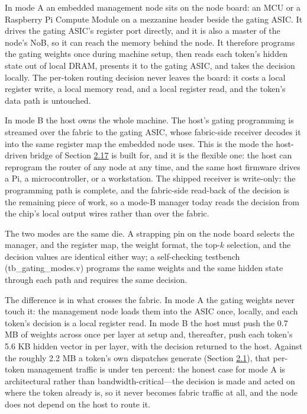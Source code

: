 \documentclass[10pt,twocolumn]{article}
\begin{document}
In mode A an embedded management node sits on the node board: an MCU or a Raspberry Pi Compute Module on a mezzanine header beside the gating ASIC. It drives the gating ASIC's register port directly, and it is also a master of the node's NoB, so it can reach the memory behind the node. It therefore programs the gating weights once during machine setup, then reads each token's hidden state out of local DRAM, presents it to the gating ASIC, and takes the decision locally. The per-token routing decision never leaves the board: it costs a local register write, a local memory read, and a local register read, and the token's data path is untouched.

In mode B the host owns the whole machine. The host's gating programming is streamed over the fabric to the gating ASIC, whose fabric-side receiver decodes it into the same register map the embedded node uses. This is the mode the host-driven bridge of Section \hyperref[sec:2.17]{2.17} is built for, and it is the flexible one: the host can reprogram the router of any node at any time, and the same host firmware drives a Pi, a microcontroller, or a workstation. The shipped receiver is write-only: the programming path is complete, and the fabric-side read-back of the decision is the remaining piece of work, so a mode-B manager today reads the decision from the chip's local output wires rather than over the fabric.

The two modes are the same die. A strapping pin on the node board selects the manager, and the register map, the weight format, the top-$k$ selection, and the decision values are identical either way; a self-checking testbench (tb\_gating\_modes.v) programs the same weights and the same hidden state through each path and requires the same decision.

The difference is in what crosses the fabric. In mode A the gating weights never touch it: the management node loads them into the ASIC once, locally, and each token's decision is a local register read. In mode B the host must push the 0.7 MB of weights across once per layer at setup and, thereafter, push each token's 5.6 KB hidden vector in per layer, with the decision returned to the host. Against the roughly 2.2 MB a token's own dispatches generate (Section \hyperref[sec:2.1]{2.1}), that per-token management traffic is under ten percent: the honest case for mode A is architectural rather than bandwidth-critical---the decision is made and acted on where the token already is, so it never becomes fabric traffic at all, and the node does not depend on the host to route it.
\end{document}
